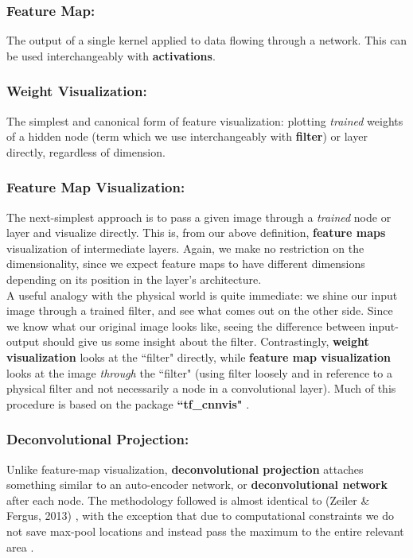 \documentclass[12pt]{article}
\begin{document}
\subsubsection{Feature Map:}
The output of a single kernel applied to data flowing through a network. This can be used interchangeably with \textbf{activations}.

\subsubsection{Weight Visualization:}
The simplest and canonical form of feature visualization: plotting \textit{trained} weights of a hidden node (term which we use interchangeably with \textbf{filter}) or layer directly, regardless of dimension.

\subsubsection{Feature Map Visualization:}
The next-simplest approach is to pass a given image through a \textit{trained} node or layer and visualize directly. This is, from our above definition, \textbf{feature maps} visualization of intermediate layers. Again, we make no restriction on the dimensionality, since we expect feature maps to have different dimensions depending on its position in the layer's architecture.\\

A useful analogy with the physical world is quite immediate: we shine our input image through a trained filter, and see what comes out on the other side. Since we know what our original image looks like, seeing the difference between input-output should give us some insight about the filter. Contrastingly, \textbf{weight visualization} looks at the ``filter" directly, while \textbf{feature map visualization} looks at the image \textit{through} the ``filter" (using filter loosely and in reference to a physical filter and not necessarily a node in a convolutional layer). Much of this procedure is based on the package \textbf{``tf\_cnnvis"} \cite{cnnvis}.

\subsubsection{Deconvolutional Projection:}
Unlike feature-map  visualization, \textbf{deconvolutional projection} attaches something similar to an auto-encoder network, or \textbf{deconvolutional network} after each node. The methodology followed is almost identical to (Zeiler \& Fergus, 2013) \cite{zeiler}, with the exception that due to computational constraints we do not save max-pool locations and instead pass the maximum to the entire relevant area \cite{oxford, kvfrans}. \\
\end{document}
